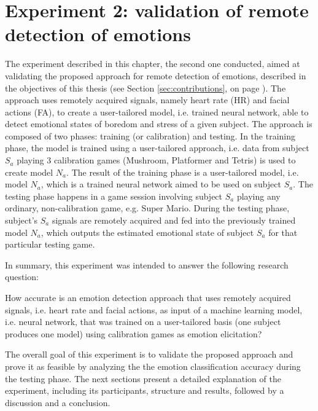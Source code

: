 \chapter{Experiment 2: validation of remote detection of emotions}
\label{ch:experiment2}

The experiment described in this chapter, the second one conducted, aimed at validating the proposed approach for remote detection of emotions, described in the objectives of this thesis (see Section \ref{sec:contributions}, on page \pageref{sec:contributions}). The approach uses remotely acquired signals, namely heart rate (HR) and facial actions (FA), to create a user-tailored model, i.e. trained neural network, able to detect emotional states of boredom and stress of a given subject. The approach is composed of two phases: training (or calibration) and testing. In the training phase, the model is trained using a user-tailored approach, i.e. data from subject $S_a$ playing 3 calibration games (Mushroom, Platformer and Tetris) is used to create model $N_a$. The result of the training phase is a user-tailored model, i.e. model $N_a$, which is a trained neural network aimed to be used on subject $S_a$. The testing phase happens in a game session involving subject $S_a$ playing any ordinary, non-calibration game, e.g. Super Mario. During the testing phase, subject's $S_a$ signals are remotely acquired and fed into the previously trained model $N_a$, which outputs the estimated emotional state of subject $S_a$ for that particular testing game.

In summary, this experiment was intended to answer the following research question:

\begin{fquote}
How accurate is an emotion detection approach that uses remotely acquired signals, i.e. heart rate and facial actions, as input of a machine learning model, i.e. neural network, that was trained on a user-tailored basis (one subject produces one model) using calibration games as emotion elicitation?
\end{fquote}

The overall goal of this experiment is to validate the proposed approach and prove it as feasible by analyzing the the emotion classification accuracy during the testing phase. The next sections present a detailed explanation of the experiment, including its participants, structure and results, followed by a discussion and a conclusion.

